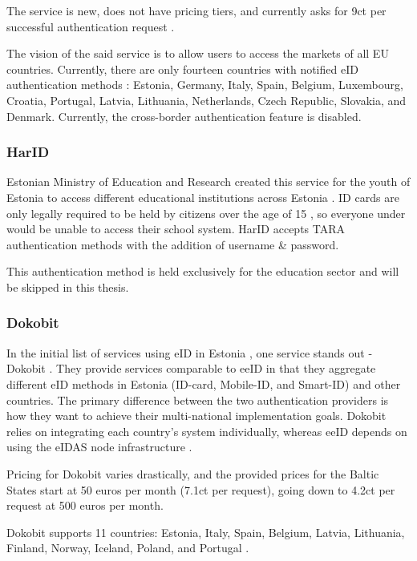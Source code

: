 The service is new, does not have pricing tiers, and currently asks for 9ct per successful authentication request \cite{eeid-pricing}.

The vision of the said service is to allow users to access the markets of all EU countries. Currently, there are only fourteen countries with notified eID authentication methods \cite{eulaw-eidas-notified}: Estonia, Germany, Italy, Spain, Belgium, Luxembourg, Croatia, Portugal, Latvia, Lithuania, Netherlands, Czech Republic, Slovakia, and Denmark. Currently, the cross-border authentication feature is disabled.

\subsubsection{HarID}

Estonian Ministry of Education and Research created this service for the youth of Estonia to access different educational institutions across Estonia \cite{harid}. ID cards are only legally required to be held by citizens over the age of 15 \cite{eelaw-idcard}, so everyone under would be unable to access their school system. HarID accepts TARA authentication methods with the addition of {username \& password}.

This authentication method is held exclusively for the education sector and will be skipped in this thesis.

\subsubsection{Dokobit}

In the initial list of services using eID in Estonia \cite{ut-eidinestonia}, one service stands out - Dokobit \cite{dokobit}. They provide services comparable to eeID in that they aggregate different eID methods in Estonia (ID-card, Mobile-ID, and Smart-ID) and other countries. The primary difference between the two authentication providers is how they want to achieve their multi-national implementation goals. Dokobit relies on integrating each country's system individually, whereas eeID depends on using the eIDAS node infrastructure \cite{eeid}.

Pricing for Dokobit varies drastically, and the provided prices for the Baltic States \cite{dokobit-pricing} start at 50 euros per month (7.1ct per request), going down to 4.2ct per request at 500 euros per month.

Dokobit supports 11 countries: Estonia, Italy, Spain, Belgium, Latvia, Lithuania, Finland, Norway, Iceland, Poland, and Portugal \cite{dokobit}.

